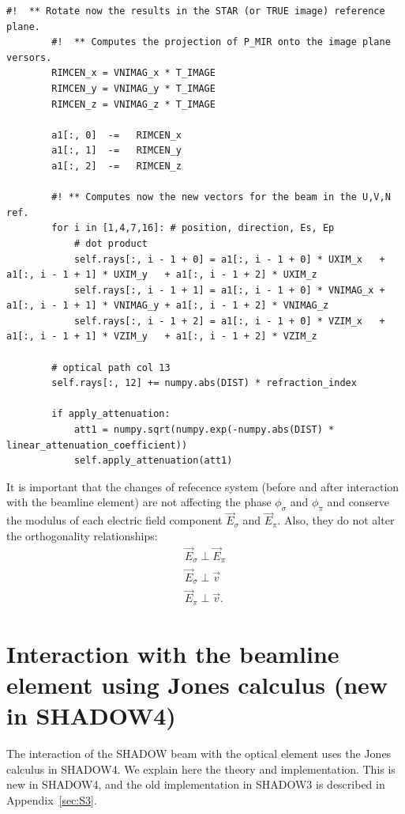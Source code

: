 \documentclass{iucr}
\begin{document}
\begin{lstlisting}[caption={\it Method of {\tt S4Beam} that changes the reference and propagates the beam from the beamline element to the image plane.}, label={lst:changetoimagereferencesystem}, captionpos=b]
        #!  ** Rotate now the results in the STAR (or TRUE image) reference plane.
        #!  ** Computes the projection of P_MIR onto the image plane versors.
        RIMCEN_x = VNIMAG_x * T_IMAGE
        RIMCEN_y = VNIMAG_y * T_IMAGE
        RIMCEN_z = VNIMAG_z * T_IMAGE

        a1[:, 0]  -=   RIMCEN_x
        a1[:, 1]  -=   RIMCEN_y
        a1[:, 2]  -=   RIMCEN_z

        #! ** Computes now the new vectors for the beam in the U,V,N ref.
        for i in [1,4,7,16]: # position, direction, Es, Ep
            # dot product
            self.rays[:, i - 1 + 0] = a1[:, i - 1 + 0] * UXIM_x   + a1[:, i - 1 + 1] * UXIM_y   + a1[:, i - 1 + 2] * UXIM_z
            self.rays[:, i - 1 + 1] = a1[:, i - 1 + 0] * VNIMAG_x + a1[:, i - 1 + 1] * VNIMAG_y + a1[:, i - 1 + 2] * VNIMAG_z
            self.rays[:, i - 1 + 2] = a1[:, i - 1 + 0] * VZIM_x   + a1[:, i - 1 + 1] * VZIM_y   + a1[:, i - 1 + 2] * VZIM_z

        # optical path col 13
        self.rays[:, 12] += numpy.abs(DIST) * refraction_index

        if apply_attenuation:
            att1 = numpy.sqrt(numpy.exp(-numpy.abs(DIST) * linear_attenuation_coefficient))
            self.apply_attenuation(att1)
\end{lstlisting}

It is important that the changes of refecence system (before and after interaction with the beamline element)  are not affecting the phase $\phi_\sigma$ and $\phi_\pi$ and conserve the modulus of each electric field component $\vec{E}_\sigma$ and $\vec{E}_\pi$. Also, they do not alter the orthogonality relationships:
\begin{eqnarray}
\label{ortho}
\vec{E}_\sigma \perp \vec{E}_\pi \nonumber \\
\vec{E}_\sigma \perp \vec{v} \nonumber \\
\vec{E}_\pi \perp \vec{v}.
\end{eqnarray}



\section{Interaction with the beamline element using Jones calculus (new in SHADOW4)}
\label{sec:S4}

The interaction of the SHADOW beam with the optical element  uses the Jones calculus in SHADOW4. We explain here the theory and implementation. This is new in SHADOW4, and the old implementation in SHADOW3 is described in Appendix~\ref{sec:S3}.
\end{document}
